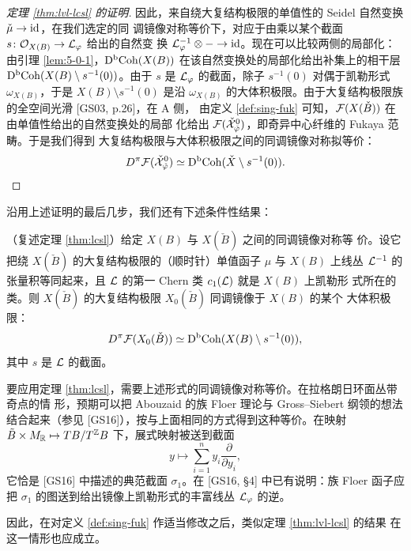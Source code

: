 \begin{proof}[定理 \ref{thm:lvl-lcsl} 的证明]
因此，来自绕大复结构极限的单值性的 Seidel 自然变换 $\check\mu\to\mathrm{id}$，在我们选定的同
调镜像对称等价下，对应于由乘以某个截面 $s\colon\mathcal{O}_{X(B)}\to\mathcal{L}_\varphi$ 给出的自然变
换 $\mathcal{L}_\varphi^{-1}\otimes-\to\mathrm{id}$。现在可以比较两侧的局部化：由引理
\ref{lem:5-0-1}，$\mathrm{D}^{\mathrm{b}}\mathrm{Coh}(X(B))$ 在该自然变换处的局部化给出补集上的相干层
$\mathrm{D}^{\mathrm{b}}\mathrm{Coh}(X(B)\setminus s^{-1}(0))$。由于 $s$ 是 $\mathcal{L}_\varphi$ 的截面，除子
$s^{-1}(0)$ 对偶于凯勒形式 $\omega_{X(B)}$，于是 $X(B)\setminus s^{-1}(0)$ 是沿
$\omega_{X(B)}$ 的大体积极限。由于大复结构极限族的全空间光滑 [GS03, p.26]，在 A 侧，
由定义 \ref{def:sing-fuk} 可知，$\mathcal{F}(X(\check B))$ 在由单值性给出的自然变换处的局部
化给出 $\mathcal{F}(\check{\mathcal{X}}^0_{\check\varphi})$，即奇异中心纤维的 Fukaya 范畴。于是我们得到
大复结构极限与大体积极限之间的同调镜像对称拟等价：
\[
D^\pi\mathcal{F}(\check{\mathcal{X}}^0_{\check\varphi})\simeq\mathrm{D}^{\mathrm{b}}\mathrm{Coh}(\check X\setminus s^{-1}(0)).
\]
\end{proof}


沿用上述证明的最后几步，我们还有下述条件性结果：

\begin{thmstar}
（复述定理 \ref{thm:lcsl}）\quad 给定 $X(B)$ 与 $X(\check B)$ 之间的同调镜像对称等
价。设它把绕 $X(\check B)$ 的大复结构极限的（顺时针）单值函子 $\mu$ 与 $X(B)$ 上线丛
$\mathcal{L}^{-1}$ 的张量积等同起来，且 $\mathcal{L}$ 的第一 Chern 类 $c_1(\mathcal{L})$ 就是 $X(B)$ 上凯勒形
式所在的类。则 $X(\check B)$ 的大复结构极限 $X_0(\check B)$ 同调镜像于 $X(B)$ 的某个
大体积极限：
\[
D^\pi\mathcal{F}(X_0(\check B))\simeq\mathrm{D}^{\mathrm{b}}\mathrm{Coh}(X(B)\setminus s^{-1}(0)),
\]
其中 $s$ 是 $\mathcal{L}$ 的截面。
\end{thmstar}

要应用定理 \ref{thm:lcsl}，需要上述形式的同调镜像对称等价。在拉格朗日环面丛带奇点的情
形，预期可以把 Abouzaid 的族 Floer 理论与 Gross--Siebert 纲领的想法结合起来（参见
[GS16]），按与上面相同的方式得到这种等价。在映射
$\tilde B\times M_{\mathbb{R}}\mapsto TB/T^{\mathbb{Z}} B$ 下，展式映射被送到截面
\[
y\mapsto\sum_{i=1}^n y_i\frac{\partial}{\partial y_i},
\]
它恰是 [GS16] 中描述的典范截面 $\sigma_1$。在 [GS16, §4] 中已有说明：族 Floer 函子应
把 $\sigma_1$ 的图送到给出镜像上凯勒形式的丰富线丛 $\mathcal{L}_\varphi$ 的逆。


因此，在对定义 \ref{def:sing-fuk} 作适当修改之后，类似定理 \ref{thm:lvl-lcsl} 的结果
在这一情形也应成立。
